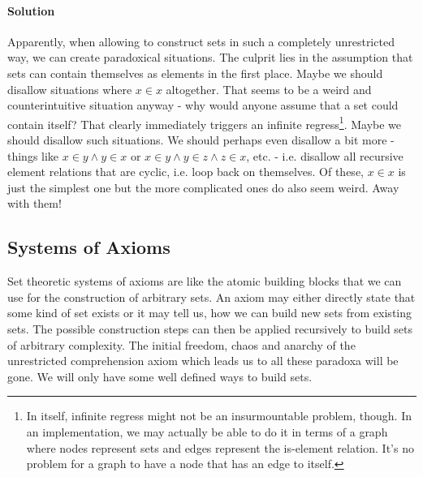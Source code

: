 \paragraph{Solution} Apparently, when allowing to construct sets in such a completely unrestricted way, we can create paradoxical situations. The culprit lies in the assumption that sets can contain themselves as elements in the first place. Maybe we should disallow situations where $x \in x$ altogether. That seems to be a weird and counterintuitive situation anyway - why would anyone assume that a set could contain itself? That clearly immediately triggers an infinite regress\footnote{In itself, infinite regress might not be an insurmountable problem, though. In an implementation, we may actually be able to do it in terms of a graph where nodes represent sets and edges represent the is-element relation. It's no problem for a graph to have a node that has an edge to itself.}. Maybe we should disallow such situations. We should perhaps even disallow a bit more - things like $x \in y \wedge y \in x$ or $x \in y \wedge y \in z \wedge z \in x$, etc. - i.e. disallow all recursive element relations that are cyclic, i.e. loop back on themselves. Of these, $x \in x$ is just the simplest one but the more complicated ones do also seem weird. Away with them!






\subsection{Systems of Axioms}
Set theoretic systems of axioms are like the atomic building blocks that we can use for the construction of arbitrary sets. An axiom may either directly state that some kind of set exists or it may tell us, how we can build new sets from existing sets. The possible construction steps can then be applied recursively to build sets of arbitrary complexity. The initial freedom, chaos and anarchy of the unrestricted comprehension axiom which leads us to all these paradoxa will be gone. We will only have some well defined ways to build sets.

